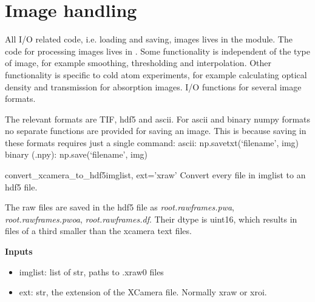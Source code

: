 \documentclass[letterpaper,10pt,english]{manual}
\begin{document}
\resetcurrentobjects


\section{Image handling}

All I/O related code, i.e. loading and saving, images lives in the \hyperlink{module-imageio}{} module. The code for processing images lives in \hyperlink{module-imageprocess}{}. Some functionality is independent of the type of image, for example smoothing, thresholding and interpolation. Other functionality is specific to cold atom experiments, for example calculating optical density and transmission for absorption images.
\modulesynopsis{}
I/O functions for several image formats.

The relevant formats are TIF, hdf5 and ascii. For ascii and binary numpy formats
no separate functions are provided for saving an image. This is because saving
in these formats requires just a single command:
ascii: np.savetxt(`filename', img)
binary (.npy): np.save(`filename', img)

\hypertarget{imageio.convert_xcamera_to_hdf5}{}\begin{funcdesc}{convert\_xcamera\_to\_hdf5}{imglist, ext='xraw'}
Convert every file in imglist to an hdf5 file.

The raw files are saved in the hdf5 file as
\emph{root.rawframes.pwa}, \emph{root.rawframes.pwoa}, \emph{root.rawframes.df}.
Their dtype is uint16, which results in files of a third smaller than
the xcamera text files.

\textbf{Inputs}
\begin{itemize}
\item {} 
imglist: list of str, paths to .xraw0 files

\item {} 
ext: str, the extension of the XCamera file. Normally xraw or xroi.

\end{itemize}
\end{funcdesc}
\end{document}
